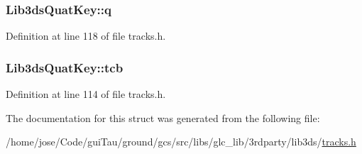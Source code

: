\hypertarget{struct_lib3ds_quat_key_af2bb7002fe26aa03689290ceaa098f18}{
\subsubsection[{q}]{ Lib3ds\-Quat\-Key\-::q}}\label{struct_lib3ds_quat_key_af2bb7002fe26aa03689290ceaa098f18}


Definition at line 118 of file tracks.\-h.

\hypertarget{struct_lib3ds_quat_key_a00687bf10f098cb71e2d63d1c4681b53}{
\subsubsection[{tcb}]{ Lib3ds\-Quat\-Key\-::tcb}}\label{struct_lib3ds_quat_key_a00687bf10f098cb71e2d63d1c4681b53}


Definition at line 114 of file tracks.\-h.



The documentation for this struct was generated from the following file\-:\begin{DoxyCompactItemize}
\item 
/home/jose/\-Code/gui\-Tau/ground/gcs/src/libs/glc\-\_\-lib/3rdparty/lib3ds/\hyperlink{tracks_8h}{tracks.\-h}\end{DoxyCompactItemize}
